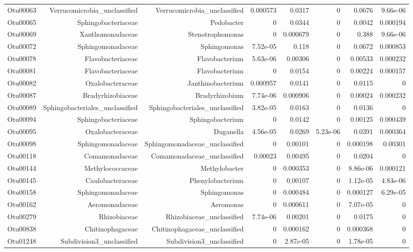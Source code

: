 \begin{table}[ht]
\begin{tabular}{crrrrrrr}
  Otu00063 & Verrucomicrobia\_unclassified & Verrucomicrobia\_unclassified & 0.000573 & 0.0317 & 0 & 0.0676 & 9.66e-06 \\ 
  Otu00065 & Sphingobacteriaceae & Pedobacter & 0 & 0.0344 & 0 & 0.0042 & 0.000194 \\ 
  Otu00069 & Xanthomonadaceae & Stenotrophomonas & 0 & 0.000679 & 0 & 0.388 & 9.66e-06 \\ 
  Otu00072 & Sphingomonadaceae & Sphingomonas & 7.52e-05 & 0.118 & 0 & 0.0672 & 0.000853 \\ 
  Otu00078 & Flavobacteriaceae & Flavobacterium & 5.63e-06 & 0.00306 & 0 & 0.00533 & 0.000232 \\ 
  Otu00081 & Flavobacteriaceae & Flavobacterium & 0 & 0.0154 & 0 & 0.00224 & 0.000157 \\ 
  Otu00082 & Oxalobacteraceae & Janthinobacterium & 0.000957 & 0.0141 & 0 & 0.0115 & 0 \\ 
  Otu00087 & Bradyrhizobiaceae & Bradyrhizobium & 7.74e-06 & 0.000906 & 0 & 0.00024 & 0.000232 \\ 
  Otu00089 & Sphingobacteriales\_unclassified & Sphingobacteriales\_unclassified & 3.82e-05 & 0.0163 & 0 & 0.0136 & 0 \\ 
  Otu00094 & Sphingobacteriaceae & Sphingobacterium & 0 & 0.0142 & 0 & 0.00125 & 0.000439 \\ 
  Otu00095 & Oxalobacteraceae & Duganella & 4.56e-05 & 0.0269 & 5.23e-06 & 0.0391 & 0.000364 \\ 
  Otu00098 & Sphingomonadaceae & Sphingomonadaceae\_unclassified & 0 & 0.00101 & 0 & 0.000198 & 0.00301 \\ 
  Otu00118 & Comamonadaceae & Comamonadaceae\_unclassified & 0.00023 & 0.00495 & 0 & 0.0204 & 0 \\ 
  Otu00144 & Methylococcaceae & Methylobacter & 0 & 0.000353 & 0 & 8.86e-06 & 0.000121 \\ 
  Otu00145 & Caulobacteraceae & Phenylobacterium & 0 & 0.00107 & 0 & 1.12e-05 & 4.83e-06 \\ 
  Otu00158 & Sphingomonadaceae & Sphingomonas & 0 & 0.000484 & 0 & 0.000127 & 6.29e-05 \\ 
  Otu00162 & Aeromonadaceae & Aeromonas & 0 & 0.000611 & 0 & 7.07e-05 & 0 \\ 
  Otu00279 & Rhizobiaceae & Rhizobiaceae\_unclassified & 7.74e-06 & 0.00201 & 0 & 0.0175 & 0 \\ 
  Otu00838 & Chitinophagaceae & Chitinophagaceae\_unclassified & 0 & 0.000162 & 0 & 0.000368 & 0 \\ 
  Otu01248 & Subdivision3\_unclassified & Subdivision3\_unclassified & 0 & 2.87e-05 & 0 & 1.78e-05 & 0 \\ 
   \hline
\end{tabular}
\end{table}
